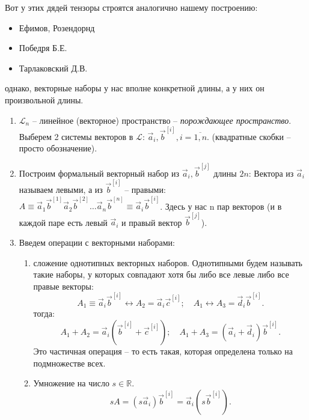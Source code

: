 Вот у этих дядей тензоры строятся аналогично нашему построению:
\begin{itemize}
  \item Ефимов, Розендорнд
  \item Победря Б.Е.
  \item Тарлаковский Д.В.
\end{itemize}
однако, векторные наборы у нас вполне конкретной длины, а у них он произвольной длины.

\begin{definition}
  \begin{enumerate}
    
    \item $\mathcal{L}_n$ -- линейное (векторное) пространство -- \emph{порождающее пространство}.
      Выберем 2 системы векторов в $\mathcal{L}$: $\vec{a}_i, \vec{b}^{[i]}, i = \overline{1, n}$.
      (квадратные скобки -- просто обозначение).

    \item Построим формальный векторный набор из $\vec{a}_i, \vec{b}^{[j]}$ длины $2n$:
      Вектора из $\vec{a}_i$ называем левыми, а из $\vec{b}^{[i]}$ -- правыми: 
      $A \equiv \vec{a}_1 \vec{b}^{[1]} \vec{a}_2 \vec{b}^{[2]} \dots \vec{a}_n \vec{b}^{[n]}
      \equiv \vec{a}_i \vec{b}^{[i]}$.
      Здесь у нас n пар векторов (и в каждой паре есть левый $\vec{a}_i$ и правый вектор
      $\vec{b}^{[j]}$).

    \item Введем операции с векторными наборами:
      \begin{enumerate}
        \item сложение однотипных векторных наборов. Однотипными будем называть такие наборы, у 
          которых совпадают хотя бы либо все левые либо все правые векторы:
          \[
            A_1 \equiv \vec{a}_i \vec{b}^{[i]} \leftrightarrow A_2 = \vec{a}_i \vec{c}^{[i]}; 
            \quad
            A_1 \leftrightarrow A_3 = \vec{d}_i \vec{b}^{[i]}.
          \]
          тогда:
          \[
            A_1+A_2 = \vec{a}_i (\vec{b}^{[i]} + \vec{c}^{[i]}); \quad
            A_1+A_3 = (\vec{a}_i + \vec{d}_i) \vec{b}^{[i]}.
          \]
          Это частичная операция -- то есть такая, которая определена только на подмножестве всех.

        \item Умножение на число $s \in \mathbb{R}$.
          \[
            sA = (s \vec{a}_i) \vec{b}^{[i]} = \vec{a}_i (s \vec{b}^{[i]}).
          \]
        

\end{enumerate}
\end{enumerate}
\end{definition}
